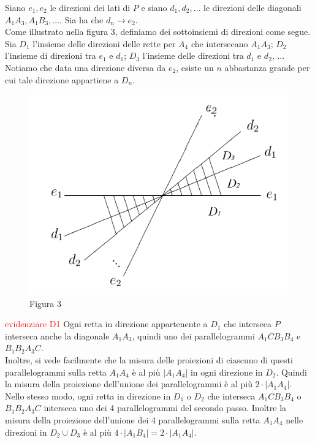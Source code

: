 \documentclass[a4paper, twoside,openright]{article}
\newcommand{\<}{\langle}
\renewcommand{\>}{\rangle}
\begin{document}
Siano $e_{1}, e_{2}$ le direzioni dei lati di $P$ e siano $d_{1}, d_{2}, \ldots$ le direzioni delle diagonali $A_{1} A_{3}, A_{1} B_{3},...$. Sia ha che $d_{n} \rightarrow e_{2}$.\\
Come illustrato nella figura 3, definiamo dei sottoinsiemi di direzioni come segue. Sia $D_1$ l'insieme delle direzioni delle rette per $A_{4}$ che intersecano $A_{1} A_{3}$; $D_2$ l'insieme di direzioni tra $e_{1}$ e $d_{1}$; $D_3$ l'insieme delle direzioni tra $d_{1}$ e $d_{2}$, ...\\
Notiamo che data una direzione diversa da $e_2$, esiste un $n$ abbastanza grande per cui tale direzione appartiene a $D_n$.

\begin{figure} [h!]
		\includegraphics[width=0.6\columnwidth]{direzioni.png}
		\centering
		\caption{Figura 3}
\end{figure}

\textcolor{red}{evidenziare D1}
Ogni retta in direzione appartenente a $D_1$ che interseca $P$ interseca anche la diagonale $A_{1} A_{3}$, quindi uno dei parallelogrammi $A_{1} C B_{3} B_{4}$ e $B_{1} B_{2} A_{3} C$.\\
Inoltre, si vede facilmente che la misura delle proiezioni di ciascuno di questi parallelogrammi sulla retta $A_{1} A_{4}$ è al più $\left|A_{1} A_{4}\right|$ in ogni direzione in $D_2$. Quindi la misura della proiezione dell'unione dei parallelogrammi è al più $2 \cdot\left|A_{1} A_{4}\right|$.\\
Nello stesso modo, ogni retta in direzione in $D_1$ o $D_2$ che interseca $A_{1} C B_{3} B_{4}$ o $B_{1} B_{2} A_{3} C$ interseca uno dei 4 parallelogrammi del secondo passo. Inoltre la misura della proiezione dell'unione dei 4 parallelogrammi sulla retta $A_{1} A_{4}$ nelle direzioni in $D_2 \cup D_3$ è al più $4 \cdot\left|A_{1} B_{4}\right|=2 \cdot\left|A_{1} A_{4}\right|$.\\
\end{document}
